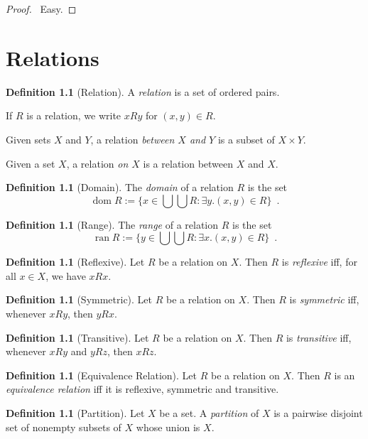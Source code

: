 \documentclass{report}
\let\qed\relax
\theoremstyle{definition}
\newtheorem{df}[ax]{Definition}
\newcommand{\dom}{\ensuremath{\operatorname{dom}}}
\newcommand{\ran}{\ensuremath{\operatorname{ran}}}
\begin{document}
\begin{proof}
\pf\ Easy. \qed
\end{proof}

\chapter{Relations}

\begin{df}[Relation]
A \emph{relation} is a set of ordered pairs.

If $R$ is a relation, we write $xRy$ for $(x,y) \in R$.

Given sets $X$ and $Y$, a relation \emph{between $X$ and $Y$} is a subset of $X \times Y$.

Given a set $X$, a relation \emph{on $X$} is a relation between $X$ and $X$.
\end{df}

\begin{df}[Domain]
The \emph{domain} of a relation $R$ is the set
\[ \dom R := \{ x \in \bigcup \bigcup R : \exists y. (x,y) \in R \} \enspace . \]
\end{df}

\begin{df}[Range]
The \emph{range} of a relation $R$ is the set
\[ \ran R := \{ y \in \bigcup \bigcup R : \exists x. (x,y) \in R \} \enspace . \]
\end{df}

\begin{df}[Reflexive]
Let $R$ be a relation on $X$. Then $R$ is \emph{reflexive} iff, for all $x \in X$, we have $xRx$.
\end{df}

\begin{df}[Symmetric]
Let $R$ be a relation on $X$. Then $R$ is \emph{symmetric} iff, whenever $xRy$, then $yRx$.
\end{df}

\begin{df}[Transitive]
Let $R$ be a relation on $X$. Then $R$ is \emph{transitive} iff, whenever $xRy$ and $yRz$, then $xRz$.
\end{df}

\begin{df}[Equivalence Relation]
Let $R$ be a relation on $X$. Then $R$ is an \emph{equivalence relation} iff it is reflexive, symmetric and transitive.
\end{df}

\begin{df}[Partition]
Let $X$ be a set. A \emph{partition} of $X$ is a pairwise disjoint set of nonempty subsets of $X$ whose union is $X$.
\end{df}
\end{document}
